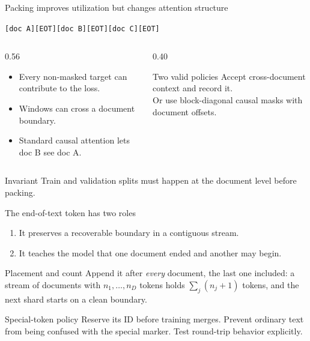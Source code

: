 \documentclass[handout]{beamer}
\begin{document}
\begin{frame}{Packing improves utilization but changes attention structure}
  \centerline{\texttt{[doc A][EOT][doc B][EOT][doc C][EOT]}}
  \vspace{6pt}
  \begin{columns}[c]
    \begin{column}{0.56\linewidth}
      \begin{itemize}
          \setlength{\itemsep}{7pt}
        \item Every non-masked target can contribute to the loss.
        \item Windows can cross a document boundary.
        \item Standard causal attention lets doc B see doc A.
      \end{itemize}
    \end{column}
    \begin{column}{0.40\linewidth}
      \begin{block}{Two valid policies}
        Accept cross-document context and record it.\\[6pt]
        Or use block-diagonal causal masks with document offsets.
      \end{block}
    \end{column}
  \end{columns}
  \begin{alertblock}{Invariant}
    Train and validation splits must happen at the document level before packing.
  \end{alertblock}
\end{frame}

\begin{frame}{The end-of-text token has two roles}
  \begin{enumerate}
      \setlength{\itemsep}{9pt}
    \item It preserves a recoverable boundary in a contiguous stream.
    \item It teaches the model that one document ended and another may begin.
  \end{enumerate}
  \begin{block}{Placement and count}
    Append it after \emph{every} document, the last one included: a stream of documents with $n_1,\dots,n_D$ tokens holds $\sum_j (n_j+1)$ tokens, and the next shard starts on a clean boundary.
  \end{block}
  \begin{alertblock}{Special-token policy}
    Reserve its ID before training merges. Prevent ordinary text from being confused with the special marker. Test round-trip behavior explicitly.
  \end{alertblock}
\end{frame}
\end{document}
